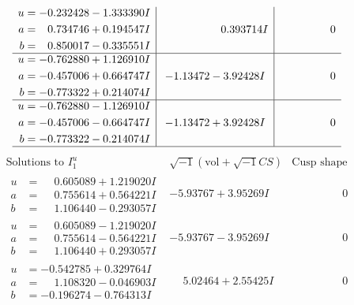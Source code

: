 \documentclass[1p]{elsarticle_modified}
\theoremstyle{definition}
\newcommand{\I}{\sqrt{-1}}
\begin{document}
$$\begin{array}{c|c|c}
\begin{aligned}
u &= -0.232428 - 1.333390 I \\
a &= \phantom{-}0.734746 + 0.194547 I \\
b &= \phantom{-}0.850017 - 0.335551 I\end{aligned}
 & \phantom{-0.000000 -}0.393714 I & \phantom{-0.000000 } 0 \\ \hline\begin{aligned}
u &= -0.762880 + 1.126910 I \\
a &= -0.457006 + 0.664747 I \\
b &= -0.773322 + 0.214074 I\end{aligned}
 & -1.13472 - 3.92428 I & \phantom{-0.000000 } 0 \\ \hline\begin{aligned}
u &= -0.762880 - 1.126910 I \\
a &= -0.457006 - 0.664747 I \\
b &= -0.773322 - 0.214074 I\end{aligned}
 & -1.13472 + 3.92428 I & \phantom{-0.000000 } 0\\
 \hline 
 \end{array}$$\newpage$$\begin{array}{c|c|c}  
\text{Solutions to }I^u_{1}& \I (\text{vol} + \sqrt{-1}CS) & \text{Cusp shape}\\
 \hline 
\begin{aligned}
u &= \phantom{-}0.605089 + 1.219020 I \\
a &= \phantom{-}0.755614 + 0.564221 I \\
b &= \phantom{-}1.106440 - 0.293057 I\end{aligned}
 & -5.93767 + 3.95269 I & \phantom{-0.000000 } 0 \\ \hline\begin{aligned}
u &= \phantom{-}0.605089 - 1.219020 I \\
a &= \phantom{-}0.755614 - 0.564221 I \\
b &= \phantom{-}1.106440 + 0.293057 I\end{aligned}
 & -5.93767 - 3.95269 I & \phantom{-0.000000 } 0 \\ \hline\begin{aligned}
u &= -0.542785 + 0.329764 I \\
a &= \phantom{-}1.108320 - 0.046903 I \\
b &= -0.196274 - 0.764313 I\end{aligned}
 & \phantom{-}5.02464 + 2.55425 I & \phantom{-0.000000 } 0 \\ \hline\begin{aligned}

\end{aligned}
\end{array}$$
\end{document}
